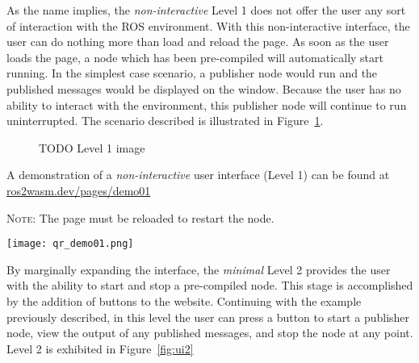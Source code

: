         As the name implies, the \textit{non-interactive} Level 1 does not offer the user
        any sort of interaction with the \ac{ROS} environment. With this non-interactive
        interface, the user can do nothing more than load and reload the page. 
        As soon as the user loads the page, a node which has been pre-compiled 
        will automatically start running. In the simplest case scenario, a publisher
        node would run and the published messages would be displayed on the window.
        Because the user has no ability to interact with the environment, this
        publisher node will continue to run uninterrupted. The scenario described
        is illustrated in Figure~\ref{fig:ui1}.

        \begin{figure}[htbp]
            \centering
            \caption{TODO Level 1 image}\label{fig:ui1}
        \end{figure}

        \begin{tcolorbox}[title=Example 1]
            \begin{minipage}[t]{0.87\linewidth}
                \vspace*{0pt}
                A demonstration of a \textit{non-interactive} user interface (Level 1) can
                be found at \href{https://ros2wasm.dev/pages/demo01/index.html}{\textsf{ros2wasm.dev/pages/demo01}}

                \textsc{Note:} The page must be reloaded to restart the node.
            \end{minipage}\hfill%
            \begin{minipage}[t]{0.1\linewidth}
                \vspace*{0pt}
                \texttt{[image: qr\_demo01.png]}
            \end{minipage}
        \end{tcolorbox}



        By marginally expanding the interface, the \textit{minimal} Level 2 provides
        the user with the ability to start and stop a pre-compiled node. This 
        stage is accomplished by the addition of buttons to the website. Continuing
        with the example previously described, in this level the user can press
        a button to start a publisher node, view the output of any published 
        messages, and stop the node at any point. Level 2 is exhibited in Figure~\ref{fig:ui2}

